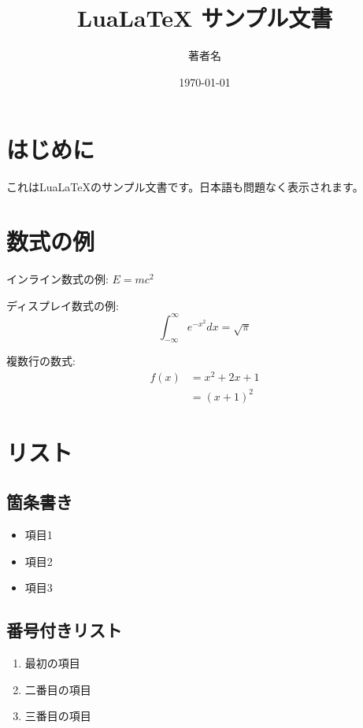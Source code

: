 \documentclass[12pt,a4paper]{article}
\title{LuaLaTeX サンプル文書}
\author{著者名}
\date{\today}
\begin{document}
\maketitle

\section{はじめに}

これはLuaLaTeXのサンプル文書です。日本語も問題なく表示されます。

\section{数式の例}

インライン数式の例: $E = mc^2$

ディスプレイ数式の例:
\begin{equation}
  \int_{-\infty}^{\infty} e^{-x^2} dx = \sqrt{\pi}
\end{equation}

複数行の数式:
\begin{align}
  f(x) &= x^2 + 2x + 1 \\
  &= (x + 1)^2
\end{align}

\section{リスト}

\subsection{箇条書き}

\begin{itemize}
  \item 項目1
  \item 項目2
  \item 項目3
\end{itemize}

\subsection{番号付きリスト}

\begin{enumerate}
  \item 最初の項目
  \item 二番目の項目
  \item 三番目の項目
\end{enumerate}
\end{document}
